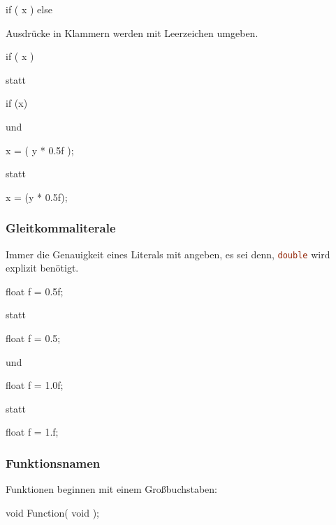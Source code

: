 \documentclass{homework-pp}
\renewcommand{\c}[1]{\lstinline[language=c,basicstyle=\ttfamily]|#1|}
\begin{document}
\begin{cblock}
if ( x ) {
} else {
}
\end{cblock}

Ausdrücke in Klammern werden mit Leerzeichen umgeben.

\begin{cblock}
if ( x ) {

}
\end{cblock}

statt

\begin{cblock}
if (x) {

}
\end{cblock}

und

\begin{cblock}
x = ( y * 0.5f );
\end{cblock}

statt

\begin{cblock}
x = (y * 0.5f);
\end{cblock}

\subsubsection{Gleitkommaliterale}

Immer die Genauigkeit eines Literals mit angeben, es sei denn, \c{double} wird explizit benötigt.

\begin{cblock}
float f = 0.5f;
\end{cblock}
statt
\begin{cblock}
float f = 0.5;
\end{cblock}

und

\begin{cblock}
float f = 1.0f;
\end{cblock}
statt
\begin{cblock}
float f = 1.f;
\end{cblock}

\subsubsection{Funktionsnamen}

Funktionen beginnen mit einem Großbuchstaben:

\begin{cblock}
void Function( void );
\end{cblock}
\end{document}
